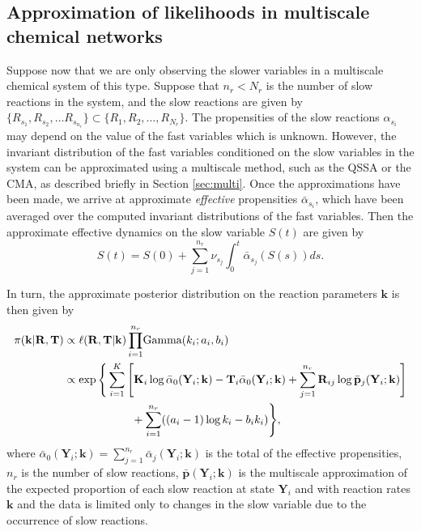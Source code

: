 \documentclass[final]{siamltex}
\begin{document}
\subsection{Approximation of likelihoods in multiscale chemical
  networks}
Suppose now that we are only observing the slower variables in a
multiscale chemical system of this type. Suppose that $n_r < N_r$ is the number of slow
reactions in the system, and the slow reactions are given by $\{R_{s_1},
R_{s_2}, \ldots R_{s_{n_r}} \} \subset \{R_1, R_2, \ldots , R_{N_r}
\}$. The propensities of the slow
reactions $\alpha_{s_i}$ may depend on the value of the fast variables which is
unknown. However, the invariant distribution of the fast variables
conditioned on the slow variables in the system can be approximated
using a multiscale method, such as the QSSA or the CMA, as described
briefly in Section \ref{sec:multi}. Once the approximations have been
made, we arrive at approximate \emph{effective} propensities $\bar{\alpha}_{s_i}$, which
have been averaged over the computed invariant distributions of the
fast variables. Then the approximate effective dynamics on the slow variable $S(t)$ are given by 
\begin{equation}\label{eq:RTCS}
S(t) = S(0) + \sum_{j=1}^{n_r} \nu_{s_j} \int_0^t \bar{\alpha}_{s_j}(S(s)) ds.
\end{equation}

In turn, the approximate posterior distribution on the reaction
parameters $\mathbf{k}$ is then given by
\begin{align}
	\pi(\mathbf{k}|\mathbf{R}, \mathbf{T}) &\propto \ell(\mathbf{R}, \mathbf{T}|\mathbf{k})
	\prod_{i=1}^{n_r} \! \text{Gamma}(k_i; a_i, b_i) \notag \\
		&\propto \exp\Bigg\{\sum\limits_{i=1}^K \Bigg[
				\mathbf{K}_i\log
                  \bar{\alpha}_0(\mathbf{Y}_i; \mathbf{k}) -
                  \mathbf{T}_i \bar{\alpha}_0(\mathbf{Y}_i; \mathbf{k}) %
				+\sum_{j=1}^{n_r} \mathbf{R}_{ij}\log \bar{\mathbf{p}}_j(\mathbf{Y}_i; \mathbf{k})
			\Bigg]  \notag\\
		&	\qquad\qquad\qquad{} + \sum_{i=1}^{n_r} ((a_i-1)\log k_i - b_ik_i)\Bigg\}, \label{eq:Apos}
\end{align}
where $\bar{\alpha}_0(\mathbf{Y}_i; \mathbf{k}) = \sum_{j=1}^{n_r}
\bar{\alpha}_j(\mathbf{Y}_i; \mathbf{k})$ is the total of the
effective propensities, $n_r$ is the number of slow reactions,
$\bar{\mathbf{p}}(\mathbf{Y}_i; \mathbf{k})$ is the multiscale
approximation of the expected proportion of each slow reaction at
state $\mathbf{Y}_i$ and with reaction rates $\mathbf{k}$ and the
data is limited only to changes in the slow variable due to the
occurrence of slow reactions.
\end{document}
